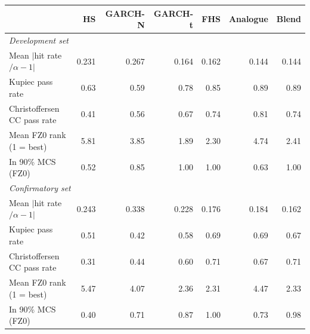 \begin{tabular}{lrrrrrr}
\toprule
& HS & GARCH-N & GARCH-t & FHS & Analogue & Blend \\
\midrule
\multicolumn{7}{l}{\textit{Development set}}\\
Mean $|$hit rate$/\alpha - 1|$ & 0.231 & 0.267 & 0.164 & 0.162 & 0.144 & 0.144\\
Kupiec pass rate & 0.63 & 0.59 & 0.78 & 0.85 & 0.89 & 0.89\\
Christoffersen CC pass rate & 0.41 & 0.56 & 0.67 & 0.74 & 0.81 & 0.74\\
Mean FZ0 rank (1 = best) & 5.81 & 3.85 & 1.89 & 2.30 & 4.74 & 2.41\\
In 90\% MCS (FZ0) & 0.52 & 0.85 & 1.00 & 1.00 & 0.63 & 1.00\\
\midrule
\multicolumn{7}{l}{\textit{Confirmatory set}}\\
Mean $|$hit rate$/\alpha - 1|$ & 0.243 & 0.338 & 0.228 & 0.176 & 0.184 & 0.162\\
Kupiec pass rate & 0.51 & 0.42 & 0.58 & 0.69 & 0.69 & 0.67\\
Christoffersen CC pass rate & 0.31 & 0.44 & 0.60 & 0.71 & 0.67 & 0.71\\
Mean FZ0 rank (1 = best) & 5.47 & 4.07 & 2.36 & 2.31 & 4.47 & 2.33\\
In 90\% MCS (FZ0) & 0.40 & 0.71 & 0.87 & 1.00 & 0.73 & 0.98\\
\bottomrule
\end{tabular}
